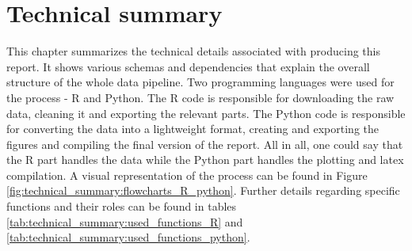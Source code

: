 \chapter{Technical summary}

This chapter summarizes the technical details associated with producing this report. It shows various schemas and dependencies that explain the overall structure of the whole data pipeline. Two programming languages were used for the process - R and Python. The R code is responsible for downloading the raw data, cleaning it and exporting the relevant parts. The Python code is responsible for converting the data into a lightweight format, creating and exporting the figures and compiling the final version of the report. All in all, one could say that the R part handles the data while the Python part handles the plotting and latex compilation. A visual representation of the process can be found in Figure \ref{fig:technical_summary:flowcharts_R_python}. Further details regarding specific functions and their roles can be found in tables \ref{tab:technical_summary:used_functions_R} and \ref{tab:technical_summary:used_functions_python}.


